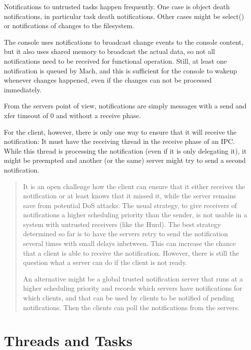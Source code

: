 \documentclass[9pt,a4paper]{extarticle}
\newenvironment{comment}{\footnotesize \begin{quote}}{\end{quote}}
\begin{document}
Notifications to untrusted tasks happen frequently.  One case is
object death notifications, in particular task death notifications.
Other cases might be select() or notifications of changes to the
filesystem.

The console uses notifications to broadcast change events to the
console content, but it also uses shared memory to broadcast the
actual data, so not all notifications need to be received for
functional operation.  Still, at least one notification is queued by
Mach, and this is sufficient for the console to wakeup whenever
changes happened, even if the changes can not be processed
immediately.
  
From the servers point of view, notifications are simply messages with
a send and xfer timeout of 0 and without a receive phase.

For the client, however, there is only one way to ensure that it will
receive the notification: It must have the receiving thread in the
receive phase of an IPC.  While this thread is processing the
notification (even if it is only delegating it), it might be preempted
and another (or the same) server might try to send a second
notification.

\begin{comment}
  It is an open challenge how the client can ensure that it either
  receives the notification or at least knows that it missed it, while
  the server remains save from potential DoS attacks.  The usual
  strategy, to give receivers of notifications a higher scheduling
  priority than the sender, is not usable in a system with untrusted
  receivers (like the Hurd).  The best strategy determined so far is
  to have the servers retry to send the notification several times
  with small delays inbetween.  This can increase the chance that a
  client is able to receive the notification.  However, there is still
  the question what a server can do if the client is not ready.
 
  An alternative might be a global trusted notification server that
  runs at a higher scheduling priority and records which servers have
  notifications for which clients, and that can be used by clients to
  be notified of pending notifications.  Then the clients can poll the
  notifications from the servers.
\end{comment}


\section{Threads and Tasks}
\end{document}
